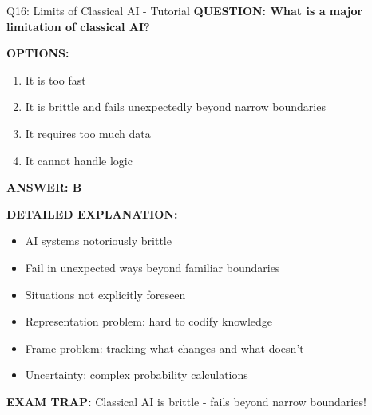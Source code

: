 \documentclass[8pt]{beamer}
\begin{document}
	\begin{frame}{Q16: Limits of Classical AI - Tutorial}
		\fontsize{6.5}{7.5}\selectfont
		\textbf{QUESTION: What is a major limitation of classical AI?}
		
		\vspace{0.1cm}
		\textbf{OPTIONS:}
		\begin{enumerate}
			\item It is too fast
			\item It is brittle and fails unexpectedly beyond narrow boundaries
			\item It requires too much data
			\item It cannot handle logic
		\end{enumerate}
		
		\vspace{0.1cm}
		\textcolor{myblue}{\textbf{ANSWER: B}}
		
		\vspace{0.1cm}
		\textbf{DETAILED EXPLANATION:}
		\begin{itemize}
			\item AI systems notoriously brittle
			\item Fail in unexpected ways beyond familiar boundaries
			\item Situations not explicitly foreseen
			\item Representation problem: hard to codify knowledge
			\item Frame problem: tracking what changes and what doesn't
			\item Uncertainty: complex probability calculations
		\end{itemize}
		
		\vspace{0.1cm}
		\textcolor{myred}{\textbf{EXAM TRAP:}} Classical AI is \textcolor{myblue}{brittle - fails beyond narrow boundaries}!
	\end{frame}
	
\end{document}
